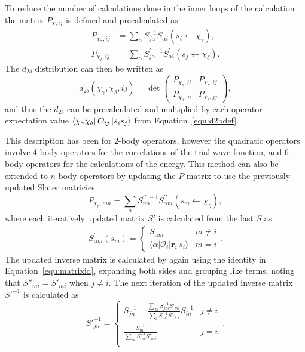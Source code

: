 To reduce the number of calculations done in the inner loops of the calculation the matrix $P_{\chi,ij}$ is defined and precalculated as
\begin{align}
   P_{\chi_\gamma,ij} &=\sum_\alpha S^{-1}_{j\alpha}S_{\alpha i}(s_i\leftarrow \chi_\gamma), \\
   P_{\chi_\delta,ij} &=\sum_\alpha S^{\prime\;-1}_{j\alpha}S^\prime_{\alpha i}(s_j\leftarrow \chi_\delta).
\end{align}
The $d_{2b}$ distribution can then be written as
\begin{equation}
   d_{2b}(\chi_\gamma,\chi_\delta,ij)=\det\begin{pmatrix}P_{\chi_\gamma,ii} & P_{\chi_\gamma,ij} \\ P_{\chi_\delta,ji} & P_{\chi_\delta,jj}\end{pmatrix},
\end{equation}
and thus the $d_{2b}$ can be precalculated and multiplied by each operator expectation value $\left< \chi_\gamma\chi_\delta \right|\mathcal{O}_{ij}\left| s_is_j \right>$ from Equation~\ref{equ:d2bdef}.

This description has been for 2-body operators, however the quadratic operators involve 4-body operators for the correlations of the trial wave function, and 6-body operators for the calculations of the energy. This method can also be extended to $n$-body operators by updating the $P$ matrix to use the previously updated Slater matricies
\begin{equation}
   P_{\chi_\eta,mn}=\sum_\alpha S^{\prime\prime\;-1}_{n\alpha}S^{\prime\prime}_{\alpha m}(s_m\leftarrow \chi_\eta),
\end{equation}
where each iteratively updated matrix $S'$ is calculated from the last $S$ as
\begin{align}
   S^{\prime}_{\alpha m}(s_m) = \left\{
   \begin{array}{cc}
      S_{\alpha m} & m \ne i\\
      \langle\alpha|\mathcal O_i|\mathbf{r}_i\,s_i\rangle  & m = i
   \end{array} .
   \right.
\end{align}
The updated inverse matrix is calculated by again using the identity in Equation~\ref{equ:matrixid}, expanding both sides and grouping like terms, noting that $S''_{mi} = S'_{mi}$ when $j\ne i$. The next iteration of the updated inverse matrix $S'^{-1}$ is calculated as
\begin{equation}
S'^{-1}_{jn} = \left \{
\begin{array}{cc}
S^{-1}_{jn} -\frac{\sum_m S^{-1}_{jm}S'_{mi}}{\sum_\ell S^{-1}_{i\ell}
S'_{\ell i}} S^{-1}_{in}  & j \ne i\\
\frac{S^{-1}_{in}}{\sum_m S^{-1}_{im}S'_{mi}} & j = i\\
\end{array}
\right . \,.
\end{equation}


